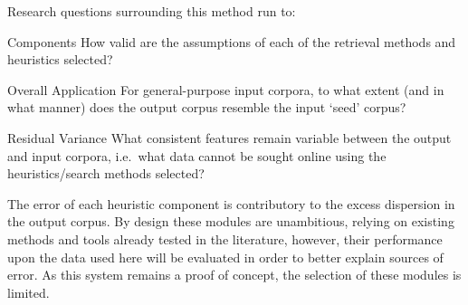 Research questions surrounding this method run to:

\begin{itemizeTitle}

    \item[Components] How valid are the assumptions of each of the retrieval methods and heuristics selected?

    \item[Overall Application] For general-purpose input corpora, to what extent (and in what manner) does the output corpus resemble the input `seed' corpus?


    \item[Residual Variance] What consistent features remain variable between the output and input corpora, i.e.\ what data cannot be sought online using the heuristics/search methods selected?

\end{itemizeTitle}

The error of each heuristic component is contributory to the excess dispersion in the output corpus.  By design these modules are unambitious, relying on existing methods and tools already tested in the literature, however, their performance upon the data used here will be evaluated in order to better explain sources of error.  As this system remains a proof of concept, the selection of these modules is limited.

